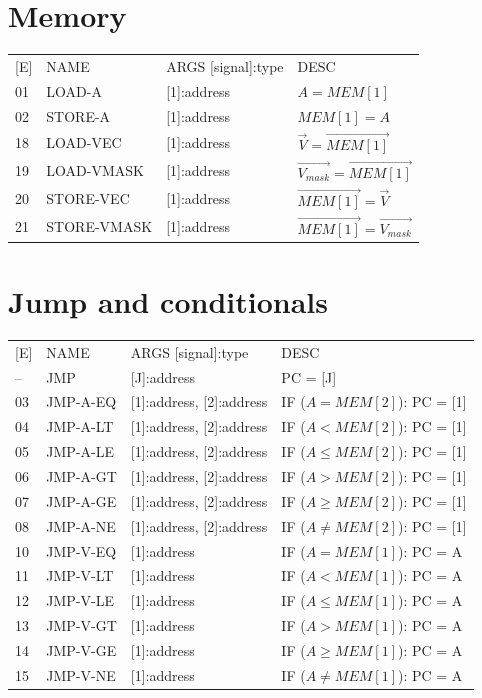 \documentclass{scrreprt}
\begin{document}
    \section{Memory}
        \begin{tabular}{l | l | l  l}
    	[E] & NAME & ARGS [signal]:type & DESC \\
    	01 & LOAD-A & [1]:address & $A = MEM[1]$\\
    	02 & STORE-A & [1]:address & $MEM[1] = A$\\
    	18 & LOAD-VEC & [1]:address & $\vec{V} = \vec{MEM[1]}$\\
    	19 & LOAD-VMASK & [1]:address & $\vec{V_{mask}} = \vec{MEM[1]}$\\
    	20 & STORE-VEC & [1]:address & $\vec{MEM[1]} = \vec{V}$\\
    	21 & STORE-VMASK & [1]:address & $\vec{MEM[1]} = \vec{V_{mask}}$\\
    	\end{tabular}
    
    \section{Jump and conditionals}
        \begin{tabular}{l | l | l  l}
    	[E] & NAME & ARGS [signal]:type & DESC \\
    	-- & JMP & [J]:address & PC = [J]\\
    	03 & JMP-A-EQ & [1]:address, [2]:address & IF ($A = MEM[2]$): PC = [1]\\
    	04 & JMP-A-LT & [1]:address, [2]:address & IF ($A < MEM[2]$): PC = [1]\\
    	05 & JMP-A-LE & [1]:address, [2]:address & IF ($A \le MEM[2]$): PC = [1]\\
    	06 & JMP-A-GT & [1]:address, [2]:address & IF ($A > MEM[2]$): PC = [1]\\
    	07 & JMP-A-GE & [1]:address, [2]:address & IF ($A \ge MEM[2]$): PC = [1]\\
    	08 & JMP-A-NE & [1]:address, [2]:address & IF ($A \ne MEM[2]$): PC = [1]\\
    	10 & JMP-V-EQ & [1]:address & IF ($A = MEM[1]$): PC = A\\
    	11 & JMP-V-LT & [1]:address & IF ($A < MEM[1]$): PC = A\\
    	12 & JMP-V-LE & [1]:address & IF ($A \le MEM[1]$): PC = A\\
    	13 & JMP-V-GT & [1]:address & IF ($A > MEM[1]$): PC = A\\
    	14 & JMP-V-GE & [1]:address & IF ($A \ge MEM[1]$): PC = A\\
    	15 & JMP-V-NE & [1]:address & IF ($A \ne MEM[1]$): PC = A\\
    	\end{tabular}
    
\end{document}
